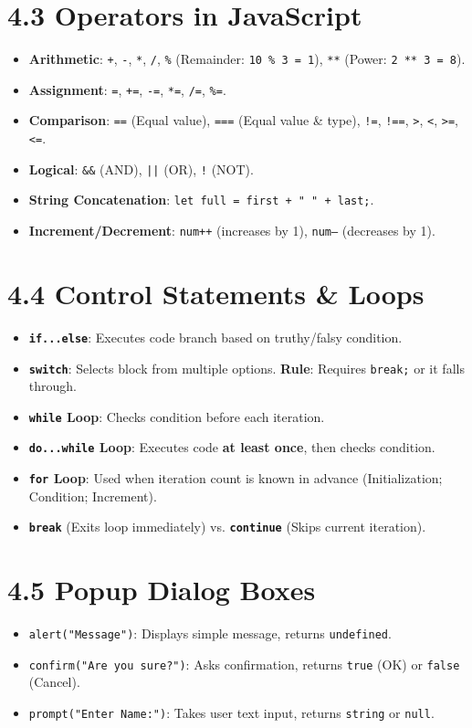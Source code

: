 \section{4.3 Operators in JavaScript}
\begin{itemize}[leftmargin=*]
    \item \textbf{Arithmetic}: \texttt{+}, \texttt{-}, \texttt{*}, \texttt{/}, \texttt{\%} (Remainder: \texttt{10 \% 3 = 1}), \texttt{**} (Power: \texttt{2 ** 3 = 8}).
    \item \textbf{Assignment}: \texttt{=}, \texttt{+=}, \texttt{-=}, \texttt{*=}, \texttt{/=}, \texttt{\%=}.
    \item \textbf{Comparison}: \texttt{==} (Equal value), \texttt{===} (Equal value \& type), \texttt{!=}, \texttt{!==}, \texttt{>}, \texttt{<}, \texttt{>=}, \texttt{<=}.
    \item \textbf{Logical}: \texttt{\&\&} (AND), \texttt{||} (OR), \texttt{!} (NOT).
    \item \textbf{String Concatenation}: \texttt{let full = first + " " + last;}.
    \item \textbf{Increment/Decrement}: \texttt{num++} (increases by 1), \texttt{num--} (decreases by 1).
\end{itemize}

\section{4.4 Control Statements \& Loops}
\begin{itemize}[leftmargin=*]
    \item \textbf{\texttt{if...else}}: Executes code branch based on truthy/falsy condition.
    \item \textbf{\texttt{switch}}: Selects block from multiple options. \textbf{Rule}: Requires \texttt{break;} or it falls through.
    \item \textbf{\texttt{while} Loop}: Checks condition before each iteration.
    \item \textbf{\texttt{do...while} Loop}: Executes code \textbf{at least once}, then checks condition.
    \item \textbf{\texttt{for} Loop}: Used when iteration count is known in advance (Initialization; Condition; Increment).
    \item \textbf{\texttt{break}} (Exits loop immediately) vs. \textbf{\texttt{continue}} (Skips current iteration).
\end{itemize}

\section{4.5 Popup Dialog Boxes}
\begin{itemize}[leftmargin=*]
    \item \texttt{alert("Message")}: Displays simple message, returns \texttt{undefined}.
    \item \texttt{confirm("Are you sure?")}: Asks confirmation, returns \texttt{true} (OK) or \texttt{false} (Cancel).
    \item \texttt{prompt("Enter Name:")}: Takes user text input, returns \texttt{string} or \texttt{null}.
\end{itemize}

